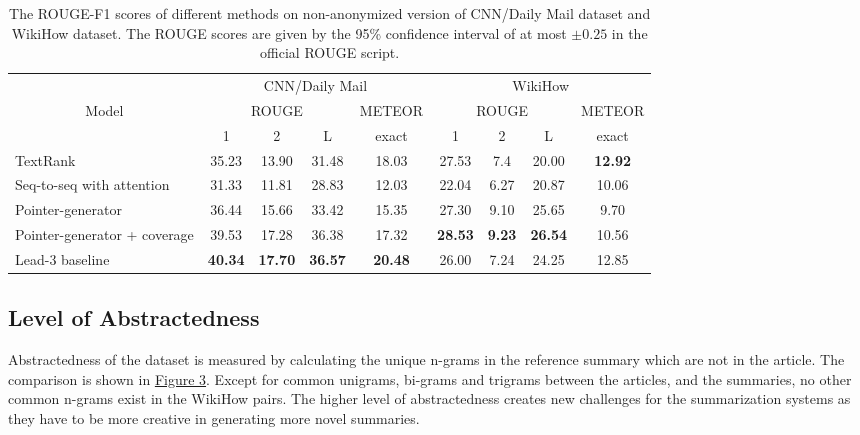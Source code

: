 \documentclass[11pt,a4paper]{article}
\begin{document}
\begin{table*}
\footnotesize
\label{results}
\centering
\begin{tabular}{|l|c|c|c|c|c|c|c|c|}
\hline
&\multicolumn{4}{|c|}{CNN/Daily Mail}&\multicolumn{4}{|c|}{WikiHow}\\
\cline{2-9}
\multicolumn{1}{|c|}{Model}&\multicolumn{3}{|c|}{ROUGE}&\multicolumn{1}{|c|}{METEOR}&\multicolumn{3}{|c|}{ROUGE}&\multicolumn{1}{|c|}{METEOR}\\
\cline{2-9}
&1&2&L&exact&1&2&L&exact\\
\hline
{TextRank} &35.23&13.90&31.48&18.03&27.53&7.4&20.00&\textbf{12.92}\\
{Seq-to-seq with attention} &31.33&11.81&28.83&12.03&22.04&6.27&20.87&10.06\\
{Pointer-generator} &36.44&15.66&33.42&15.35&27.30&9.10&25.65&9.70\\
{Pointer-generator + coverage} &39.53&17.28&36.38&17.32&\textbf{28.53}&\textbf{9.23}&\textbf{26.54}&10.56\\
\hline
{Lead-3 baseline} &\textbf{40.34}&\textbf{17.70}&\textbf{36.57}&\textbf{20.48}&26.00&7.24 &24.25&12.85\\
\hline
\end{tabular}
\caption{The ROUGE-F1 scores of different methods on non-anonymized version of CNN/Daily Mail dataset and WikiHow dataset. The ROUGE scores are given by the 95\% confidence interval of at most $\pm0.25$ in the official ROUGE script.}
\end{table*}

\subsection{Level of Abstractedness}
Abstractedness of the dataset is measured by calculating the unique n-grams in the reference summary which are not in the article. 
The comparison is shown in \hyperref[fig:abstract]{Figure 3}. Except for common unigrams, bi-grams and trigrams between the articles, and the summaries, no other common n-grams exist in the WikiHow pairs. The higher level of abstractedness creates new challenges for the summarization systems as they have to be more creative in generating more novel summaries.
\end{document}
